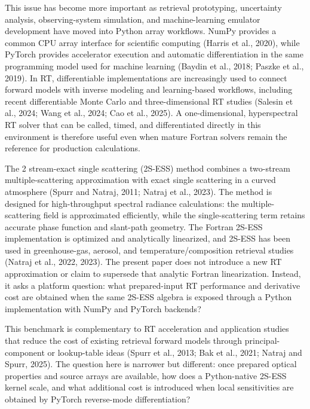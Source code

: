 \documentclass[gmd, manuscript]{copernicus}
\begin{document}
This issue has become more important as retrieval prototyping, uncertainty analysis,
observing-system simulation, and machine-learning emulator development have moved into
Python array workflows.  NumPy provides a common CPU array interface for scientific
computing (Harris et al., 2020), while PyTorch provides accelerator execution and
automatic differentiation in the same programming model used for machine learning
(Baydin et al., 2018; Paszke et al., 2019).  In RT, differentiable implementations are
increasingly used to connect forward models with inverse modeling and learning-based
workflows, including recent differentiable Monte Carlo and three-dimensional RT studies
(Salesin et al., 2024; Wang et al., 2024; Cao et al., 2025).  A one-dimensional,
hyperspectral RT solver that can be called, timed, and differentiated directly in this
environment is therefore useful even when mature Fortran solvers remain the reference
for production calculations.

The 2 stream-exact single scattering (2S-ESS) method combines a two-stream
multiple-scattering approximation with exact single scattering in a curved atmosphere
(Spurr and Natraj, 2011; Natraj et al., 2023).  The method is designed for
high-throughput spectral radiance calculations: the multiple-scattering field is
approximated efficiently, while the single-scattering term retains accurate phase
function and slant-path geometry.  The Fortran 2S-ESS implementation is optimized and
analytically linearized, and 2S-ESS has been used in greenhouse-gas, aerosol, and
temperature/composition retrieval studies (Natraj et al., 2022, 2023).  The present
paper does not introduce a new RT approximation or claim to supersede that analytic
Fortran linearization.  Instead, it asks a platform question: what prepared-input RT
performance and derivative cost are obtained when the same 2S-ESS algebra is exposed
through a Python implementation with NumPy and PyTorch backends?

This benchmark is complementary to RT acceleration and application studies that reduce
the cost of existing retrieval forward models through principal-component or
lookup-table ideas (Spurr et al., 2013; Bak et al., 2021; Natraj and Spurr, 2025).  The
question here is narrower but different: once prepared optical properties and source
arrays are available, how does a Python-native 2S-ESS kernel scale, and what additional
cost is introduced when local sensitivities are obtained by PyTorch reverse-mode
differentiation?
\end{document}
